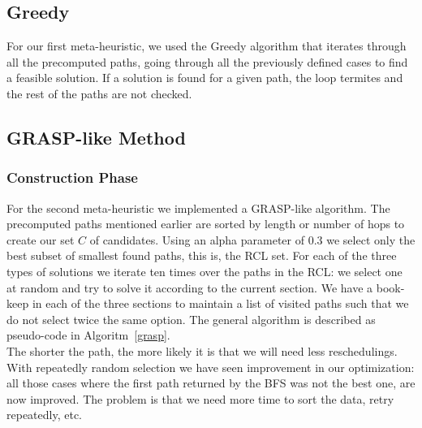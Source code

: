 \documentclass[11pt,a4paper]{article}
\begin{document}
\subsection{Greedy}
For our first meta-heuristic, we used the Greedy algorithm that iterates through all the precomputed paths, going through all the previously defined cases to find a feasible solution. If a solution is found for a given path, the loop termites and the rest of the paths are not checked.
 
\subsection{GRASP-like Method} 

\subsubsection{Construction Phase}

For the second meta-heuristic we implemented a GRASP-like algorithm. The precomputed paths mentioned earlier are sorted by length or number of hops to create our set $C$ of candidates. Using an alpha parameter of 0.3 we select only the best subset of smallest found paths, this is, the RCL set. For each of the three types of solutions we iterate ten times over the paths in the RCL: we select one at random and try to solve it according to the current section. We have a book-keep in each of the three sections to maintain a list of visited paths such that we do not select twice the same option. The general algorithm is described as pseudo-code in Algoritm~\ref{grasp}.\\

The shorter the path, the more likely it is that we will need less reschedulings. With repeatedly random selection we have seen improvement in our optimization: all those cases where the first path returned by the BFS was not the best one, are now improved. The problem is that we need more time to sort the data, retry repeatedly, etc.
\end{document}
